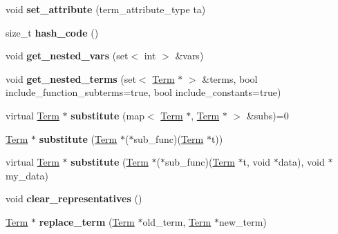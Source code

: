 \begin{DoxyCompactItemize}
\item 
\hypertarget{classTerm_ae3d488f52f259da2b203ae425e0a42be}{void {\bfseries set\-\_\-attribute} (term\-\_\-attribute\-\_\-type ta)}\label{classTerm_ae3d488f52f259da2b203ae425e0a42be}

\item 
\hypertarget{classTerm_a9cb1e2671d02520182861808f692fbce}{size\-\_\-t {\bfseries hash\-\_\-code} ()}\label{classTerm_a9cb1e2671d02520182861808f692fbce}

\item 
\hypertarget{classTerm_afa34fcef6d5c648c36108eb1afbbffb1}{void {\bfseries get\-\_\-nested\-\_\-vars} (set$<$ int $>$ \&vars)}\label{classTerm_afa34fcef6d5c648c36108eb1afbbffb1}

\item 
\hypertarget{classTerm_a50ac643f14b8a613afcb73c25f8a6a70}{void {\bfseries get\-\_\-nested\-\_\-terms} (set$<$ \hyperlink{classTerm}{\-Term} $\ast$ $>$ \&terms, bool include\-\_\-function\-\_\-subterms=true, bool include\-\_\-constants=true)}\label{classTerm_a50ac643f14b8a613afcb73c25f8a6a70}

\item 
\hypertarget{classTerm_acd2d1f7f504ce1c18b790366f1b84c7b}{virtual \hyperlink{classTerm}{\-Term} $\ast$ {\bfseries substitute} (map$<$ \hyperlink{classTerm}{\-Term} $\ast$, \hyperlink{classTerm}{\-Term} $\ast$ $>$ \&subs)=0}\label{classTerm_acd2d1f7f504ce1c18b790366f1b84c7b}

\item 
\hypertarget{classTerm_ad1d5f30b5f3e2863bfbf732ae3729694}{\hyperlink{classTerm}{\-Term} $\ast$ {\bfseries substitute} (\hyperlink{classTerm}{\-Term} $\ast$($\ast$sub\-\_\-func)(\hyperlink{classTerm}{\-Term} $\ast$t))}\label{classTerm_ad1d5f30b5f3e2863bfbf732ae3729694}

\item 
\hypertarget{classTerm_a60bad8e42e0062d7ba1513ce60a5e578}{virtual \hyperlink{classTerm}{\-Term} $\ast$ {\bfseries substitute} (\hyperlink{classTerm}{\-Term} $\ast$($\ast$sub\-\_\-func)(\hyperlink{classTerm}{\-Term} $\ast$t, void $\ast$data), void $\ast$my\-\_\-data)}\label{classTerm_a60bad8e42e0062d7ba1513ce60a5e578}

\item 
\hypertarget{classTerm_aff7d56374e09bfc139e1830318d03d51}{void {\bfseries clear\-\_\-representatives} ()}\label{classTerm_aff7d56374e09bfc139e1830318d03d51}

\item 
\hypertarget{classTerm_a9a1d4db8f0ce99e2f7056f6211858f8c}{\hyperlink{classTerm}{\-Term} $\ast$ {\bfseries replace\-\_\-term} (\hyperlink{classTerm}{\-Term} $\ast$old\-\_\-term, \hyperlink{classTerm}{\-Term} $\ast$new\-\_\-term)}\label{classTerm_a9a1d4db8f0ce99e2f7056f6211858f8c}


\end{DoxyCompactItemize}
